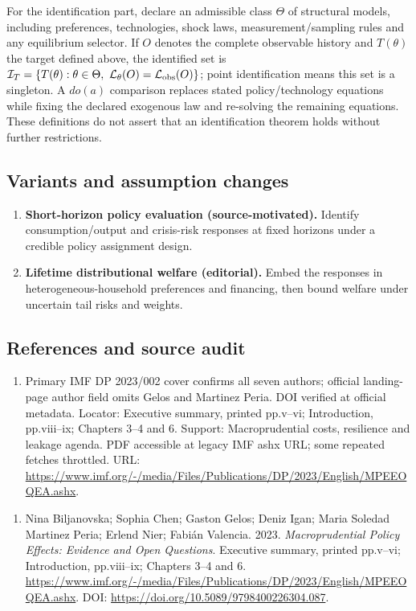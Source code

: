 \documentclass[11pt,a4paper]{article}
\begin{document}
For the identification part, declare an admissible class \(\Theta\) of structural models, including preferences, technologies, shock laws, measurement/sampling rules and any equilibrium selector. If \(O\) denotes the complete observable history and \(T(\theta)\) the target defined above, the identified set is \(\mathcal I_T=\{T(\theta):\theta\in\Theta,\ \mathcal L_\theta(O)=\mathcal L_{\rm obs}(O)\}\); point identification means this set is a singleton. A \(do(a)\) comparison replaces stated policy/technology equations while fixing the declared exogenous law and re-solving the remaining equations. These definitions do not assert that an identification theorem holds without further restrictions.
\subsection*{Variants and assumption changes}
\begin{enumerate}
\item \textbf{Short-horizon policy evaluation (source-motivated).} Identify consumption/output and crisis-risk responses at fixed horizons under a credible policy assignment design.
\item \textbf{Lifetime distributional welfare (editorial).} Embed the responses in heterogeneous-household preferences and financing, then bound welfare under uncertain tail risks and weights.
\end{enumerate}
\subsection*{References and source audit}
\begin{enumerate}
\item Primary IMF DP 2023/002 cover confirms all seven authors; official landing-page author field omits Gelos and Martinez Peria. DOI verified at official metadata. Locator: Executive summary, printed pp.v--vi; Introduction, pp.viii--ix; Chapters 3--4 and 6. Support: Macroprudential costs, resilience and leakage agenda. PDF accessible at legacy IMF ashx URL; some repeated fetches throttled. URL: \url{https://www.imf.org/-/media/Files/Publications/DP/2023/English/MPEEOQEA.ashx}.
\end{enumerate}
\begin{enumerate}\raggedright
\item\hypertarget{definitions:source:30007606:1}{} Nina Biljanovska; Sophia Chen; Gaston Gelos; Deniz Igan; Maria Soledad Martinez Peria; Erlend Nier; Fabián Valencia. 2023. \emph{Macroprudential Policy Effects: Evidence and Open Questions}. Executive summary, printed pp.v--vi; Introduction, pp.viii--ix; Chapters 3--4 and 6.
\url{https://www.imf.org/-/media/Files/Publications/DP/2023/English/MPEEOQEA.ashx}.
DOI: \url{https://doi.org/10.5089/9798400226304.087}.
\end{enumerate}
\end{document}
